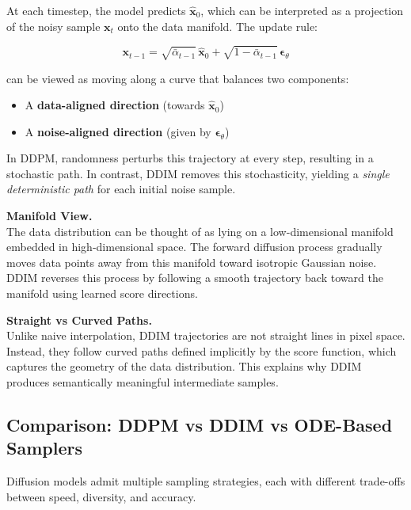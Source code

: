 At each timestep, the model predicts $\hat{\mathbf{x}}_0$, which can be interpreted as a projection of the noisy sample $\mathbf{x}_t$ onto the data manifold. The update rule:

\begin{equation}
\mathbf{x}_{t-1}
=
\sqrt{\bar{\alpha}_{t-1}}\,\hat{\mathbf{x}}_0
+
\sqrt{1 - \bar{\alpha}_{t-1}}\,\boldsymbol{\epsilon}_\theta
\end{equation}

can be viewed as moving along a curve that balances two components:
\begin{itemize}
    \item A \textbf{data-aligned direction} (towards $\hat{\mathbf{x}}_0$)
    \item A \textbf{noise-aligned direction} (given by $\boldsymbol{\epsilon}_\theta$)
\end{itemize}

In DDPM, randomness perturbs this trajectory at every step, resulting in a stochastic path. In contrast, DDIM removes this stochasticity, yielding a \textit{single deterministic path} for each initial noise sample.

\vspace{0.5em}
\noindent
\textbf{Manifold View.} \\
The data distribution can be thought of as lying on a low-dimensional manifold embedded in high-dimensional space. The forward diffusion process gradually moves data points away from this manifold toward isotropic Gaussian noise. DDIM reverses this process by following a smooth trajectory back toward the manifold using learned score directions.

\vspace{0.5em}
\noindent
\textbf{Straight vs Curved Paths.} \\
Unlike naive interpolation, DDIM trajectories are not straight lines in pixel space. Instead, they follow curved paths defined implicitly by the score function, which captures the geometry of the data distribution. This explains why DDIM produces semantically meaningful intermediate samples.

\subsection{Comparison: DDPM vs DDIM vs ODE-Based Samplers}

Diffusion models admit multiple sampling strategies, each with different trade-offs between speed, diversity, and accuracy.

